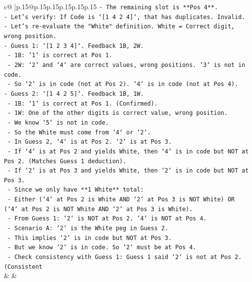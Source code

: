 \documentclass{article}
\begin{document}
{\begin{supertabular}{c@{$\;$}|p{.15\linewidth}@{}p{.15\linewidth}p{.15\linewidth}p{.15\linewidth}p{.15\linewidth}p{.15\linewidth}}
{{{\texttt{{-} The remaining slot is **Pos 4**.} \\
\texttt{{-} Let's verify: If Code is `{[}1 4 2 4{]}`, that has duplicates. Invalid.} \\
\texttt{{-} Let's re{-}evaluate the "White" definition. White = Correct digit, wrong position.} \\
\texttt{{-} Guess 1: `{[}1 2 3 4{]}`. Feedback 1B, 2W.} \\
\texttt{  {-} 1B: `1` is correct at Pos 1.} \\
\texttt{  {-} 2W: `2` and `4` are correct values, wrong positions. `3` is not in code.} \\
\texttt{  {-} So `2` is in code (not at Pos 2). `4` is in code (not at Pos 4).} \\
\texttt{{-} Guess 2: `{[}1 4 2 5{]}`. Feedback 1B, 1W.} \\
\texttt{  {-} 1B: `1` is correct at Pos 1. (Confirmed).} \\
\texttt{  {-} 1W: One of the other digits is correct value, wrong position.} \\
\texttt{  {-} We know `5` is not in code.} \\
\texttt{  {-} So the White must come from `4` or `2`.} \\
\texttt{  {-} In Guess 2, `4` is at Pos 2. `2` is at Pos 3.} \\
\texttt{  {-} If `4` is at Pos 2 and yields White, then `4` is in code but NOT at Pos 2. (Matches Guess 1 deduction).} \\
\texttt{  {-} If `2` is at Pos 3 and yields White, then `2` is in code but NOT at Pos 3.} \\
\texttt{  {-} Since we only have **1 White** total:} \\
\texttt{    {-} Either (`4` at Pos 2 is White AND `2` at Pos 3 is NOT White) OR (`4` at Pos 2 is NOT White AND `2` at Pos 3 is White).} \\
\texttt{  {-} From Guess 1: `2` is NOT at Pos 2. `4` is NOT at Pos 4.} \\
\texttt{  {-} Scenario A: `2` is the White peg in Guess 2.} \\
\texttt{    {-} This implies `2` is in code but NOT at Pos 3.} \\
\texttt{    {-} But we know `2` is in code. So `2` must be at Pos 4.} \\
\texttt{    {-} Check consistency with Guess 1: Guess 1 said `2` is not at Pos 2. (Consistent} \\
            }
        }
    }
    & & \\ \\


\end{supertabular}}
\end{document}
